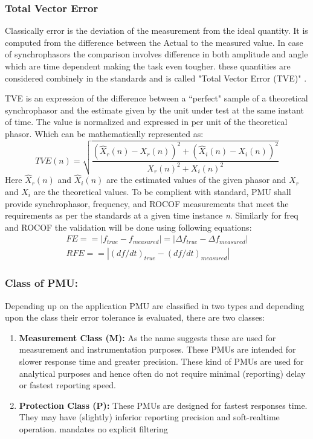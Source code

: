 \subsubsection{Total Vector Error}
Classically error is the deviation of the measurement from the ideal quantity. It is computed from the difference between the Actual to the measured value. In case of synchrophasors the comparison involves difference in both amplitude and angle which are time dependent making the task even tougher. these quantities are considered combinely in the standards and is called "Total Vector Error (TVE)" \cite{c37.118}.  

TVE is an expression of the difference between a ``perfect" sample of a theoretical synchrophasor and the estimate given by the unit under test at the same instant of time. The value is normalized and expressed in per unit of the theoretical phasor. Which can be mathematically represented as: 
\begin{equation}
TVE(n) = \sqrt{\frac{ (\hat{X}_r(n) - X_r(n))^2 + (\hat{X}_i(n)-X_i(n))^2} {X_r(n)^2 + X_i(n)^2}}
\end{equation}
Here $ \hat{X}_r (n)$ and $\hat{X}_i(n) $ are the estimated values of the given phasor and $X_r$ and $X_i$ are the theoretical values.
To be complient with standard, PMU shall provide synchrophasor, frequency, and ROCOF measurements that meet the requirements as per the standards at a given time instance \textit{n}. Similarly for freq and ROCOF the validation will be done using following equations:
\begin{eqnarray}
FE == |f_{true}-f_{measured}| = |\Delta f_{true}-\Delta f_{measured}| \\
RFE == |(df/dt)_{true}-(df/dt)_{measured} |
\end{eqnarray}

\subsubsection{Class of PMU:}
Depending up on the application PMU are classified in two types and depending upon the class their error tolerance is evaluated, there are two classes:
\begin{enumerate}
	\item \textbf{Measurement Class (M):} As the name suggests these are used for measurement and instrumentation purposes. These PMUs are intended for slower response time and greater precision. These kind of PMUs are used for analytical purposes and hence often do not require minimal (reporting) delay or fastest reporting speed.
	\item \textbf{Protection Class (P):} These PMUs are designed for fastest responses time. They may have (slightly) inferior reporting precision and soft-realtime operation. 
	mandates no explicit filtering
\end{enumerate} 

